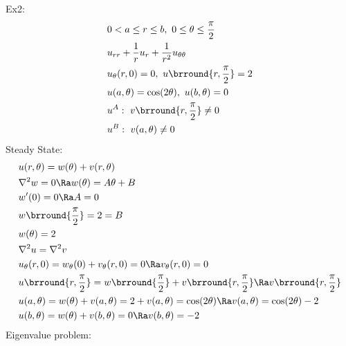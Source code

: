 Ex2:
\begin{align*}
    &0<a\leq r\leq b,\ 0\leq\theta\leq\frac{\pi}{2}\\
    &u_{rr}+\frac{1}{r}u_r+\frac{1}{r^2}u_{\theta\theta}\\
    &u_\theta(r,0)=0,\ u\brround{r,\frac{\pi}{2}}=2\\
    &u(a,\theta)=\cos(2\theta),\ u(b,\theta)=0\\
    &u^A:\ v\brround{r,\frac{\pi}{2}}\neq 0\\
    &u^B:\ v(a,\theta)\neq 0
\end{align*}
Steady State:
\begin{align*}
    &u(r,\theta)=w(\theta)+v(r,\theta)\\
    &\nabla^2w=0\Ra w(\theta)=A\theta+B\\
    &w'(0)=0\Ra A=0\\
    &w\brround{\frac{\pi}{2}}=2=B\\
    &w(\theta)=2\\
    &\nabla^2u=\nabla^2 v\\
    &u_\theta(r,0)=w_\theta(0)+v_\theta(r,0)=0\Ra v_\theta(r,0)=0\\
    &u\brround{r,\frac{\pi}{2}}=w\brround{\frac{\pi}{2}}+v\brround{r,\frac{\pi}{2}}\Ra v\brround{r,\frac{\pi}{2}}\\
    &u(a,\theta)=w(\theta)+v(a,\theta)=2+v(a,\theta)=\cos(2\theta)\Ra v(a,\theta)=\cos(2\theta)-2\\
    &u(b,\theta)=w(\theta)+v(b,\theta)=0\Ra v(b,\theta)=-2
\end{align*}
Eigenvalue problem:
